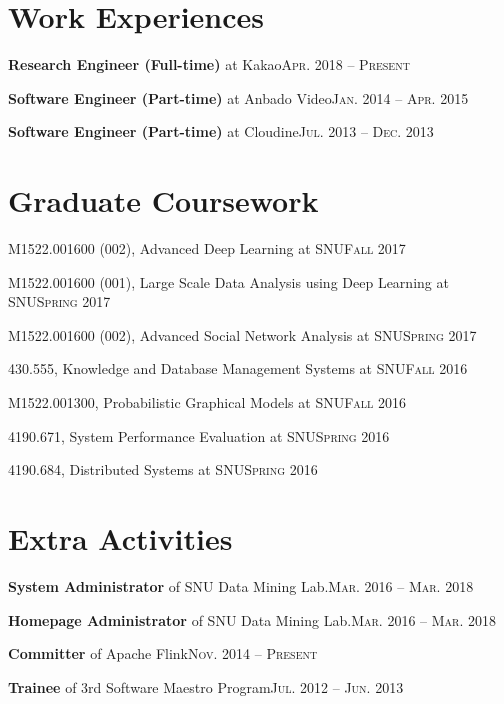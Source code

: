 \documentclass[11pt,a4paper]{article}
\renewenvironment{itemize}{
  \begin{list}{}{
    \setlength{\leftmargin}{1.5em}
    \setlength{\itemsep}{0.5em}
    \setlength{\parskip}{0pt}
    \setlength{\parsep}{0.25em}
  }
}{
  \end{list}
}
\begin{document}
\section*{Work Experiences}
\begin{itemize}
	\setlength\itemsep{0.1em}
  \item \textbf{Research Engineer (Full-time)} at Kakao\hfill\textsc{Apr. 2018 -- Present}
  \item \textbf{Software Engineer (Part-time)} at Anbado Video\hfill\textsc{Jan. 2014 -- Apr. 2015}
  \item \textbf{Software Engineer (Part-time)} at Cloudine\hfill\textsc{Jul. 2013 -- Dec. 2013}
\end{itemize}

\section*{Graduate Coursework}
\begin{itemize}
	\setlength\itemsep{0.1em}
  \item M1522.001600 (002), Advanced Deep Learning at SNU\hfill\textsc{Fall 2017}
	\item M1522.001600 (001), Large Scale Data Analysis using Deep Learning at SNU\hfill\textsc{Spring 2017}
	\item M1522.001600 (002), Advanced Social Network Analysis at SNU\hfill\textsc{Spring 2017}
	\item 430.555, Knowledge and Database Management Systems at SNU\hfill\textsc{Fall 2016}
	\item M1522.001300, Probabilistic Graphical Models at SNU\hfill\textsc{Fall 2016}
	\item 4190.671, System Performance Evaluation at SNU\hfill\textsc{Spring 2016}
	\item 4190.684, Distributed Systems at SNU\hfill\textsc{Spring 2016}
\end{itemize}

\section*{Extra Activities}
\begin{itemize}
	\setlength\itemsep{0.1em}
  \item \textbf{System Administrator} of SNU Data Mining Lab.\hfill\textsc{Mar. 2016 -- Mar. 2018}
  \item \textbf{Homepage Administrator} of SNU Data Mining Lab.\hfill\textsc{Mar. 2016 -- Mar. 2018}
  \item \textbf{Committer} of Apache Flink\hfill\textsc{Nov. 2014 -- Present}
  \item \textbf{Trainee} of 3rd Software Maestro Program\hfill\textsc{Jul. 2012 -- Jun. 2013}
\end{itemize}
\end{document}
